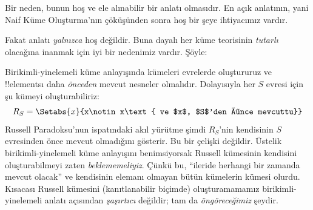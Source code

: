 \documentclass[../../../include/open-logic-section]{subfiles}
\begin{document}
Bir neden, bunun hoş ve ele alınabilir bir anlatı olmasıdır. En açık
anlatının, yani Naif Küme Oluşturma'nın çöküşünden sonra hoş bir şeye
ihtiyacımız vardır.

Fakat anlatı \emph{yalnızca} hoş değildir. Buna dayalı her küme teorisinin
\emph{tutarlı} olacağına inanmak için iyi bir nedenimiz vardır. Şöyle:

Birikimli-yinelemeli küme anlayışında kümeleri evrelerde oluştururuz ve
!!{element}s{}ı daha \emph{önceden} mevcut nesneler olmalıdır. Dolayısıyla her
$S$ evresi için şu kümeyi oluşturabiliriz:
\[
  R_S=\Setabs{x}{x\notin x\text{ ve $x$, $S$'den önce mevcuttu}}
\]
Russell Paradoksu'nun ispatındaki akıl yürütme şimdi $R_S$'nin kendisinin
$S$ evresinden önce mevcut olmadığını gösterir. Bu bir çelişki değildir.
Üstelik birikimli-yinelemeli küme anlayışını benimsiyorsak Russell kümesinin
kendisini oluşturabilmeyi zaten \emph{beklememeliyiz}. Çünkü bu, ``ileride
herhangi bir zamanda mevcut olacak'' ve kendisinin elemanı olmayan bütün
kümelerin kümesi olurdu. Kısacası Russell kümesini (kanıtlanabilir biçimde)
oluşturamamamız birikimli-yinelemeli anlatı açısından \emph{şaşırtıcı}
değildir; tam da \emph{öngöreceğimiz} şeydir.

%

\end{document}
